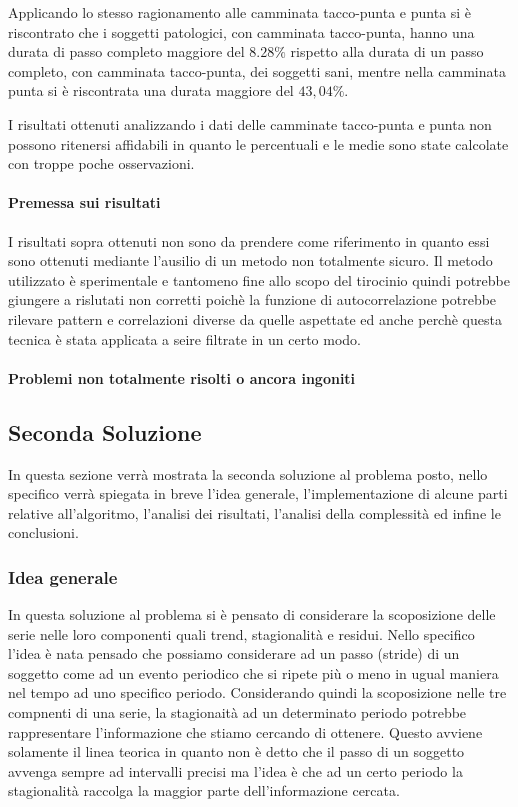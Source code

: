 Applicando lo stesso ragionamento alle camminata tacco-punta e punta si è riscontrato che 
i soggetti patologici, con camminata tacco-punta, hanno una durata di passo completo maggiore del 
$8.28\%$ rispetto alla durata di un passo completo, con camminata tacco-punta, dei soggetti sani, 
mentre nella camminata punta si è riscontrata una durata maggiore del $43,04\%$.

I risultati ottenuti analizzando i dati delle camminate tacco-punta e punta non possono ritenersi affidabili
in quanto le percentuali e le medie sono state calcolate con troppe poche osservazioni.


\paragraph*{Premessa sui risultati}
I risultati sopra ottenuti non sono da prendere come riferimento in quanto essi sono ottenuti
mediante l'ausilio di un metodo non totalmente sicuro. Il metodo utilizzato è sperimentale e tantomeno 
fine allo scopo del tirocinio quindi potrebbe giungere a rislutati non corretti 
poichè la funzione di autocorrelazione potrebbe rilevare pattern e correlazioni diverse da quelle
aspettate ed anche perchè questa tecnica è stata applicata a seire filtrate in un certo modo.

\paragraph*{Problemi non totalmente risolti o ancora ingoniti}



\subsection{Seconda Soluzione}
In questa sezione verrà mostrata la seconda soluzione al problema posto, nello
specifico verrà spiegata in breve l’idea generale, l’implementazione di alcune parti relative all'algoritmo, 
l’analisi dei risultati, l’analisi della complessità ed infine
le conclusioni.

\subsubsection{Idea generale}
In questa soluzione al problema si è pensato di considerare la scoposizione delle serie nelle 
loro componenti quali trend, stagionalità e residui. Nello specifico l'idea è nata
pensado che possiamo considerare ad un passo (stride) di un soggetto come ad un evento periodico
che si ripete più o meno in ugual maniera nel tempo ad uno specifico periodo. Considerando quindi
la scoposizione nelle tre compnenti di una serie, la stagionaità ad un determinato periodo potrebbe
rappresentare l'informazione che stiamo cercando di ottenere. Questo avviene solamente il linea teorica
in quanto non è detto che il passo di un soggetto avvenga sempre ad intervalli precisi ma l'idea è che
ad un certo periodo la stagionalità raccolga la maggior parte dell'informazione cercata.

